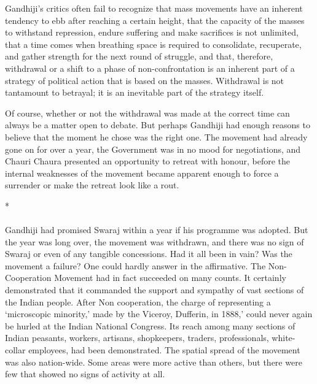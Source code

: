 Gandhiji's critics often fail to recognize that mass movements have an inherent tendency to ebb after reaching a certain height, that the capacity of the masses to withstand repression, endure suffering and make sacrifices is not unlimited, that a time comes when breathing space is required to consolidate, recuperate, and gather strength for the next round of struggle, and that, therefore, withdrawal or a shift to a phase of non-confrontation is an inherent part of a strategy of political action that is based on the masses. Withdrawal is not tantamount to betrayal; it is an inevitable part of the strategy itself. 

Of course, whether or not the withdrawal was made at the correct time can always be a matter open to debate. But perhaps Gandhiji had enough reasons to believe that the moment he chose was the right one. The movement had already gone on for over a year, the Government was in no mood for negotiations, and Chauri Chaura presented an opportunity to retreat with honour, before the internal weaknesses of the movement became apparent enough to force a surrender or make the retreat look like a rout.

\begin{center}*\end{center}

\paragraph*{}


Gandhiji had promised Swaraj within a year if his programme was adopted. But the year was long over, the movement was withdrawn, and there was no sign of Swaraj or even of any tangible concessions. Had it all been in vain? Was the movement a failure? One could hardly answer in the affirmative. The Non- Cooperation Movement had in fact succeeded on many counts. It certainly demonstrated that it commanded the support and sympathy of vast sections of the Indian people. After Non­ cooperation, the charge of representing a `microscopic minority,' made by the Viceroy, Dufferin, in 1888,' could never again be hurled at the Indian National Congress. Its reach among many sections of Indian peasants, workers, artisans, shopkeepers, traders, professionals, white-collar employees, had been demonstrated. The spatial spread of the movement was also nation-wide. Some areas were more active than others, but there were few that showed no signs of activity at all. 

